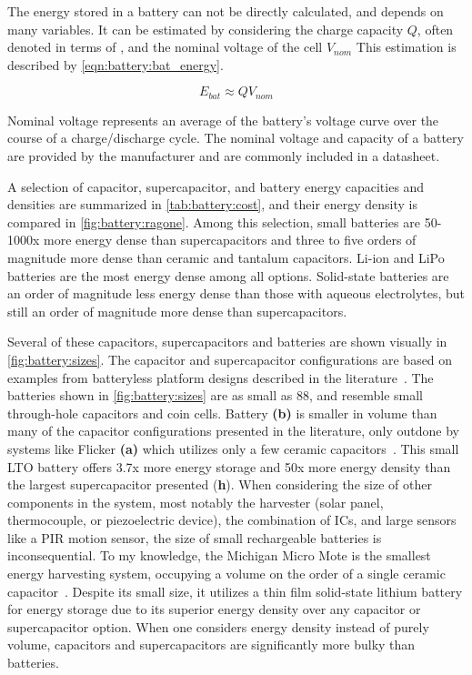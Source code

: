 The energy stored in a battery can not be directly calculated, and depends on many variables. It can be estimated by considering the charge capacity $Q$, often denoted in terms of \si{\Ah}, and the nominal voltage of the cell $V_{nom}$
This estimation is described by \cref{eqn:battery:bat_energy}.

\begin{equation} \label{eqn:battery:bat_energy}
E_{bat} \approx Q V_{nom}
\end{equation}

\noindent Nominal voltage represents an average of the battery's voltage curve over the course of a charge/discharge cycle. The nominal voltage and capacity of a battery are provided by the manufacturer and are commonly included in a datasheet.


A selection of capacitor, supercapacitor, and battery energy capacities and densities are summarized in \cref{tab:battery:cost}, and their energy density is compared in \cref{fig:battery:ragone}. Among this selection, small batteries are 50-1000x more energy dense than supercapacitors and three to five orders of magnitude more dense than ceramic and tantalum capacitors. Li-ion and LiPo batteries are the most energy dense among all options. Solid-state batteries are an order of magnitude less energy dense than those with aqueous electrolytes, but still an order of magnitude more dense than supercapacitors. 

Several of these capacitors, supercapacitors and batteries are shown visually in \cref{fig:battery:sizes}.
The capacitor and supercapacitor configurations are based on examples from batteryless platform designs described in the literature~\cite{hesterFlicker17, campbellEnergy14,colinReconfigurable18}.
The batteries shown in \cref{fig:battery:sizes} are
as small as 88\ssi{\milli\meter\cubed}, and resemble small through-hole
capacitors and coin cells. Battery \textbf{(b)} is smaller in volume than many of the capacitor
configurations presented in the literature, only outdone by systems like Flicker \textbf{(a)} which utilizes only a few ceramic capacitors~\cite{hesterFlicker17}.
This small LTO battery offers 3.7x 
more energy storage and 50x more energy density than the largest supercapacitor presented (\textbf{h}). When considering the size of other components in the system, most notably the harvester (solar panel, thermocouple, or piezoelectric device), the combination of ICs, and large sensors like a PIR motion sensor, the size of small rechargeable batteries is inconsequential. 
To my knowledge, the Michigan Micro Mote is the smallest energy harvesting system, occupying a volume on the order of a single ceramic capacitor~\cite{lee2013modular}. Despite its small size, it utilizes a thin film solid-state lithium battery for energy storage due to its superior energy density over any capacitor or supercapacitor option.
When one considers energy density instead of purely volume, capacitors and supercapacitors are significantly more bulky than batteries.

